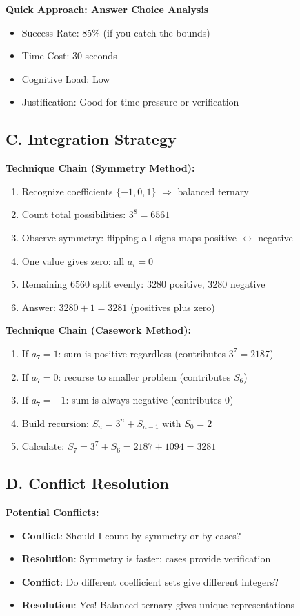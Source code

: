 \documentclass[12pt]{article}
\begin{document}
\begin{conversionbox}
\textbf{Quick Approach: Answer Choice Analysis}
\begin{itemize}
    \item Success Rate: 85\% (if you catch the bounds)
    \item Time Cost: 30 seconds
    \item Cognitive Load: Low
    \item Justification: Good for time pressure or verification
\end{itemize}

\subsection*{C. Integration Strategy}

\textbf{Technique Chain (Symmetry Method):}
\begin{enumerate}
    \item Recognize coefficients $\{-1,0,1\}$ $\Rightarrow$ balanced ternary
    \item Count total possibilities: $3^8 = 6561$
    \item Observe symmetry: flipping all signs maps positive $\leftrightarrow$ negative
    \item One value gives zero: all $a_i = 0$
    \item Remaining $6560$ split evenly: $3280$ positive, $3280$ negative
    \item Answer: $3280 + 1 = 3281$ (positives plus zero)
\end{enumerate}

\textbf{Technique Chain (Casework Method):}
\begin{enumerate}
    \item If $a_7 = 1$: sum is positive regardless (contributes $3^7 = 2187$)
    \item If $a_7 = 0$: recurse to smaller problem (contributes $S_6$)
    \item If $a_7 = -1$: sum is always negative (contributes $0$)
    \item Build recursion: $S_n = 3^n + S_{n-1}$ with $S_0 = 2$
    \item Calculate: $S_7 = 3^7 + S_6 = 2187 + 1094 = 3281$
\end{enumerate}

\subsection*{D. Conflict Resolution}

\textbf{Potential Conflicts:}
\begin{itemize}
    \item \textbf{Conflict}: Should I count by symmetry or by cases?
    \item \textbf{Resolution}: Symmetry is faster; cases provide verification
    \item \textbf{Conflict}: Do different coefficient sets give different integers?
    \item \textbf{Resolution}: Yes! Balanced ternary gives unique representations
\end{itemize}
\end{conversionbox}
\end{document}

